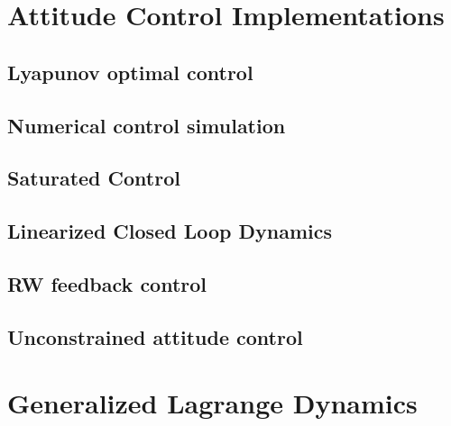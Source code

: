 \documentclass{article}
\begin{document}
\section{Attitude Control Implementations}
\subsection{Lyapunov optimal control}
\subsection{Numerical control simulation}
\subsection{Saturated Control}
\subsection{Linearized Closed Loop Dynamics}
\subsection{RW feedback control}
\subsection{Unconstrained attitude control}

\appendix
\section{Generalized Lagrange Dynamics}
\label{section_generalized_lagrange_dynamics}
\end{document}

